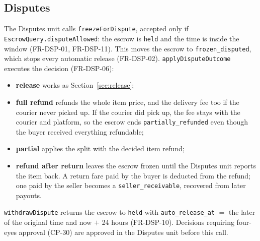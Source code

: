 \documentclass[11pt,a4paper]{article}
\begin{document}
\subsection{Disputes}
\label{sec:disputes}
The Disputes unit calls \texttt{freezeForDispute}, accepted only if \texttt{EscrowQuery.disputeAllowed}: the escrow is \texttt{held} and the time is inside the window (FR-DSP-01, FR-DSP-11). This moves the escrow to \texttt{frozen\_disputed}, which stops every automatic release (FR-DSP-02). \texttt{applyDisputeOutcome} executes the decision (FR-DSP-06):
\begin{itemize}[nosep]
  \item \textbf{release} works as Section~\ref{sec:release};
  \item \textbf{full refund} refunds the whole item price, and the delivery fee too if the courier never picked up. If the courier did pick up, the fee stays with the courier and platform, so the escrow ends \texttt{partially\_refunded} even though the buyer received everything refundable;
  \item \textbf{partial} applies the split with the decided item refund;
  \item \textbf{refund after return} leaves the escrow frozen until the Disputes unit reports the item back. A return fare paid by the buyer is deducted from the refund; one paid by the seller becomes a \texttt{seller\_receivable}, recovered from later payouts.
\end{itemize}
\texttt{withdrawDispute} returns the escrow to \texttt{held} with \texttt{auto\_release\_at} $=$ the later of the original time and now $+$ 24 hours (FR-DSP-10). Decisions requiring four-eyes approval (CP-30) are approved in the Disputes unit before this call.
\end{document}
